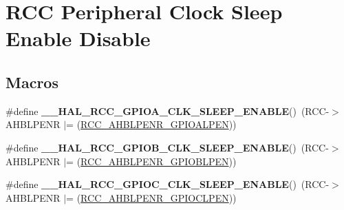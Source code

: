 \hypertarget{group___r_c_c___peripheral___clock___sleep___enable___disable}{\section{R\-C\-C Peripheral Clock Sleep Enable Disable}
\label{group___r_c_c___peripheral___clock___sleep___enable___disable}
}
\subsection*{Macros}
\begin{DoxyCompactItemize}
\item 
\hypertarget{group___r_c_c___peripheral___clock___sleep___enable___disable_gaff8820b47bd3764e7cded76b9368460b}{\#define {\bfseries \-\_\-\-\_\-\-H\-A\-L\-\_\-\-R\-C\-C\-\_\-\-G\-P\-I\-O\-A\-\_\-\-C\-L\-K\-\_\-\-S\-L\-E\-E\-P\-\_\-\-E\-N\-A\-B\-L\-E}()~(R\-C\-C-\/$>$A\-H\-B\-L\-P\-E\-N\-R $\vert$= (\hyperlink{group___peripheral___registers___bits___definition_ga8fdb2dae547fe9b89381c894ae21e08a}{R\-C\-C\-\_\-\-A\-H\-B\-L\-P\-E\-N\-R\-\_\-\-G\-P\-I\-O\-A\-L\-P\-E\-N}))}\label{group___r_c_c___peripheral___clock___sleep___enable___disable_gaff8820b47bd3764e7cded76b9368460b}

\item 
\hypertarget{group___r_c_c___peripheral___clock___sleep___enable___disable_ga0e718efc965ab07752cd865c3f33551a}{\#define {\bfseries \-\_\-\-\_\-\-H\-A\-L\-\_\-\-R\-C\-C\-\_\-\-G\-P\-I\-O\-B\-\_\-\-C\-L\-K\-\_\-\-S\-L\-E\-E\-P\-\_\-\-E\-N\-A\-B\-L\-E}()~(R\-C\-C-\/$>$A\-H\-B\-L\-P\-E\-N\-R $\vert$= (\hyperlink{group___peripheral___registers___bits___definition_ga1943c1a7faf87f869a4a381bb17fb0ea}{R\-C\-C\-\_\-\-A\-H\-B\-L\-P\-E\-N\-R\-\_\-\-G\-P\-I\-O\-B\-L\-P\-E\-N}))}\label{group___r_c_c___peripheral___clock___sleep___enable___disable_ga0e718efc965ab07752cd865c3f33551a}

\item 
\hypertarget{group___r_c_c___peripheral___clock___sleep___enable___disable_gac62505cc695d985fcf18ca1fd2f1a421}{\#define {\bfseries \-\_\-\-\_\-\-H\-A\-L\-\_\-\-R\-C\-C\-\_\-\-G\-P\-I\-O\-C\-\_\-\-C\-L\-K\-\_\-\-S\-L\-E\-E\-P\-\_\-\-E\-N\-A\-B\-L\-E}()~(R\-C\-C-\/$>$A\-H\-B\-L\-P\-E\-N\-R $\vert$= (\hyperlink{group___peripheral___registers___bits___definition_ga31961dd470a5be30373cd496ae6da055}{R\-C\-C\-\_\-\-A\-H\-B\-L\-P\-E\-N\-R\-\_\-\-G\-P\-I\-O\-C\-L\-P\-E\-N}))}\label{group___r_c_c___peripheral___clock___sleep___enable___disable_gac62505cc695d985fcf18ca1fd2f1a421}


\end{DoxyCompactItemize}
